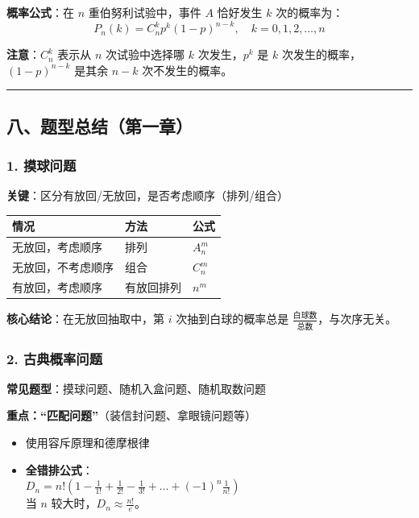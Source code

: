 \documentclass[12pt,a4paper]{ctexart}
\begin{document}
\textbf{概率公式}：在 $n$ 重伯努利试验中，事件 $A$ 恰好发生 $k$ 次的概率为：
\[ P_n(k) = C_n^k p^k (1-p)^{n-k}, \quad k = 0,1,2,\dots,n \]

\textbf{注意}：$C_n^k$ 表示从 $n$ 次试验中选择哪 $k$ 次发生，$p^k$ 是 $k$ 次发生的概率，$(1-p)^{n-k}$ 是其余 $n-k$ 次不发生的概率。

\vspace{1em}\hrule\vspace{1em}

\subsection{八、题型总结（第一章）}

\subsubsection{1. 摸球问题}
\textbf{关键}：区分有放回/无放回，是否考虑顺序（排列/组合）

\begin{center}
    \begin{tabular}{@{}lll@{}}
        \toprule
        \textbf{情况} & \textbf{方法} & \textbf{公式} \\ \midrule
        无放回，考虑顺序    & 排列          & $A_n^m$     \\
        无放回，不考虑顺序   & 组合          & $C_n^m$     \\
        有放回，考虑顺序    & 有放回排列       & $n^m$       \\ \bottomrule
    \end{tabular}
\end{center}

\textbf{核心结论}：在无放回抽取中，第 $i$ 次抽到白球的概率总是 $\frac{\text{白球数}}{\text{总数}}$，与次序无关。

\subsubsection{2. 古典概率问题}
\textbf{常见题型}：摸球问题、随机入盒问题、随机取数问题

\textbf{重点：“匹配问题”}（装信封问题、拿眼镜问题等）
\begin{itemize}[noitemsep]
    \item 使用容斥原理和德摩根律
    \item \textbf{全错排公式}：\\
          $D_n = n! \left(1 - \frac{1}{1!} + \frac{1}{2!} - \frac{1}{3!} + \dots + (-1)^n \frac{1}{n!}\right)$ \\
          当 $n$ 较大时，$D_n \approx \frac{n!}{e}$。
\end{itemize}
\end{document}
